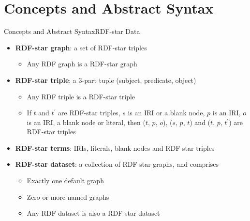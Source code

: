 \documentclass[aspectratio=169]{beamer}
\begin{document}
\section{Concepts and Abstract Syntax}
\begin{frame}{Concepts and Abstract Syntax}{RDF-star Data}
    \begin{itemize}
        \item \textbf{RDF-star graph}: a set of RDF-star triples
        \begin{itemize}
        \item Any RDF graph is a RDF-star graph
        \end{itemize}
        \item \textbf{RDF-star triple}: a 3-part tuple (subject, predicate, object)
        \begin{itemize}
            \item Any RDF triple is a RDF-star triple
            \item If $t$ and $t^{\prime}$ are RDF-star triples, $s$ is an IRI or a blank node, $p$ is an IRI, $o$ is an IRI, a blank node or literal, then ($t$, $p$, $o$), ($s$, $p$, $t$) and ($t$, $p$, $t^{\prime}$) are RDF-star triples
        \end{itemize}
        \item \textbf{RDF-star terms}: IRIs, literals, blank nodes and RDF-star triples
        \item \textbf{RDF-star dataset}: a collection of RDF-star graphs, and comprises
            \begin{itemize}
                \item Exactly one default graph
                \item Zero or more named graphs
                \item Any RDF dataset is also a RDF-star dataset
            \end{itemize}
    \end{itemize}
\end{frame}
\end{document}
